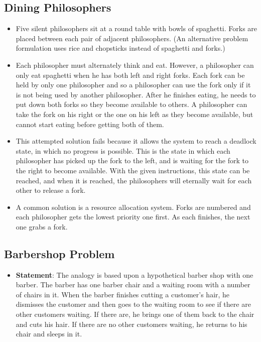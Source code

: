 \documentclass[fontsize=5pt]{scrartcl}
\begin{document}
\begin{multicols}{3}
\begin{itemize}
        \end{itemize}

      \subsection{Dining Philosophers}
        \begin{itemize}
          \item Five silent philosophers sit at a round table with bowls of spaghetti. Forks are placed between each pair of adjacent philosophers. (An alternative problem formulation uses rice and chopsticks instead of spaghetti and forks.)
          \item Each philosopher must alternately think and eat. However, a philosopher can only eat spaghetti when he has both left and right forks. Each fork can be held by only one philosopher and so a philosopher can use the fork only if it is not being used by another philosopher. After he finishes eating, he needs to put down both forks so they become available to others. 
                A philosopher can take the fork on his right or the one on his left as they become available, but cannot start eating before getting both of them.
          \item This attempted solution fails because it allows the system to reach a deadlock state, in which no progress is possible. This is the state in which each philosopher has picked up the fork to the left, and is waiting for the fork to the right to become available. 
                With the given instructions, this state can be reached, and when it is reached, the philosophers will eternally wait for each other to release a fork.
          \item A common solution is a resource allocation system. Forks are numbered and each philosopher gets the lowest priority one first. As each finishes, the next one grabs a fork.
        \end{itemize}

      \subsection{Barbershop Problem}
        \begin{itemize}
          \item \textbf{Statement}: The analogy is based upon a hypothetical barber shop with one barber. The barber has one barber chair and a waiting room with a number of chairs in it. When the barber finishes cutting a customer's hair, he dismisses the customer and then goes to the waiting room to see if there are other customers waiting. 
                                    If there are, he brings one of them back to the chair and cuts his hair. If there are no other customers waiting, he returns to his chair and sleeps in it.
        \end{itemize}





\end{multicols}
\end{document}
